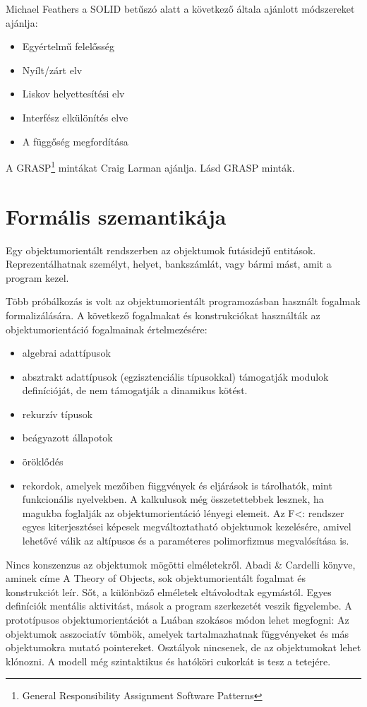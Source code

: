 \documentclass[]{thesis-ekf}
\theoremstyle{definition}
\begin{document}
	Michael Feathers a SOLID betűszó alatt a következő általa ajánlott módszereket ajánlja:
	\begin{itemize}
		\item Egyértelmű felelősség
		\item Nyílt/zárt elv
		\item Liskov helyettesítési elv
		\item Interfész elkülönítés elve
		\item A függőség megfordítása
	\end{itemize}
	A GRASP\footnote{General Responsibility Assignment Software Patterns} mintákat Craig Larman ajánlja. Lásd GRASP minták.
	
	\chapter{Formális szemantikája}\label{fejezet-formsz}
	
	Egy objektumorientált rendszerben az objektumok futásidejű entitások. Reprezentálhatnak személyt, helyet, bankszámlát, vagy bármi mást, amit a program kezel.
	
	Több próbálkozás is volt az objektumorientált programozásban használt fogalmak formalizálására. A következő fogalmakat és konstrukciókat használták az objektumorientáció fogalmainak értelmezésére:
	
	\begin{itemize}
		\item algebrai adattípusok
		\item absztrakt adattípusok (egzisztenciális típusokkal) támogatják modulok definícióját, de nem támogatják a dinamikus kötést.
		\item rekurzív típusok
		\item beágyazott állapotok
		\item öröklődés
		\item rekordok, amelyek mezőiben függvények és eljárások is tárolhatók, mint funkcionális nyelvekben. A kalkulusok még összetettebbek lesznek, ha magukba foglalják az objektumorientáció lényegi elemeit. Az F<: rendszer egyes kiterjesztései képesek megváltoztatható objektumok kezelésére, amivel lehetővé válik az altípusos és a paraméteres polimorfizmus megvalósítása is.
	\end{itemize}
	
	Nincs konszenzus az objektumok mögötti elméletekről. Abadi \& Cardelli könyve, aminek címe A Theory of Objects, sok objektumorientált fogalmat és konstrukciót leír. Sőt, a különböző elméletek eltávolodtak egymástól. Egyes definíciók mentális aktivitást, mások a program szerkezetét veszik figyelembe. A prototípusos objektumorientációt a Luában szokásos módon lehet megfogni: Az objektumok asszociatív tömbök, amelyek tartalmazhatnak függvényeket és más objektumokra mutató pointereket. Osztályok nincsenek, de az objektumokat lehet klónozni. A modell még szintaktikus és hatóköri cukorkát is tesz a tetejére.
	
\end{document}
